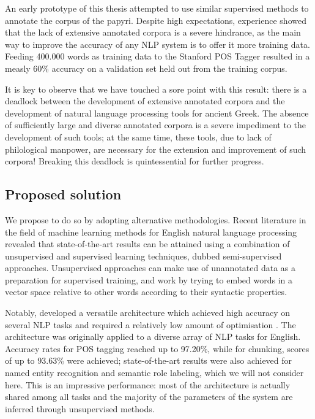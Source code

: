 An early prototype of this thesis attempted to use similar supervised
methods to annotate the corpus of the papyri. Despite high
expectations, experience showed that the lack of extensive annotated
corpora is a severe hindrance, as the main way to improve the accuracy
of any NLP system is to offer it more training data. Feeding 400.000
words as training data to the Stanford POS Tagger resulted in a measly
60\% accuracy on a validation set held out from the training corpus.

It is key to observe that we have touched a sore point with this
result: there is a deadlock between the development of extensive
annotated corpora and the development of natural language processing
tools for ancient Greek. The absence of sufficiently large and diverse
annotated corpora is a severe impediment to the development of such
tools; at the same time, these tools, due to lack of philological
manpower, are necessary for the extension and improvement of such
corpora! Breaking this deadlock is quintessential for further progress.

\subsection{Proposed solution}

We propose to do so by adopting alternative methodologies. Recent
literature in the field of machine learning methods for English
natural language processing revealed that state-of-the-art results
can be attained using a combination of unsupervised and supervised
learning techniques, dubbed semi-supervised approaches. Unsupervised
approaches can make use of unannotated data as a preparation for
supervised training, and work by trying to embed words in a vector
space relative to other words according to their syntactic properties.

Notably, \citeauthor{collobert2008} developed a versatile architecture
which achieved high accuracy on several NLP tasks and required a
relatively low amount of optimisation
\citep{collobert2008,collobert-2011}. The architecture was originally
applied to a diverse array of NLP tasks for English. Accuracy rates
for POS tagging reached up to 97.20\%, while for chunking, scores of
up to 93.63\% were achieved; state-of-the-art results were also
achieved for named entity recognition and semantic role labeling,
which we will not consider here. This is an impressive performance:
most of the architecture is actually shared among all tasks and the
majority of the parameters of the system are inferred through
unsupervised methods.

